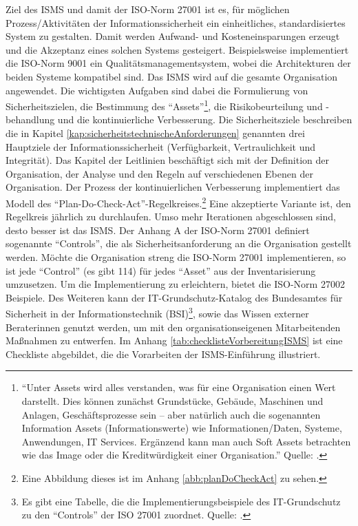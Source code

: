 Ziel des \ac{ISMS} und damit der ISO-Norm 27001 ist es, für möglichen Prozess/Aktivitäten der Informationssicherheit ein einheitliches, standardisiertes System zu gestalten. Damit werden Aufwand- und Kosteneinsparungen erzeugt und die Akzeptanz eines solchen Systems gesteigert. Beispielsweise implementiert die ISO-Norm 9001 ein Qualitätsmanagementsystem\autocite{dindeutsches_institut_fur_normung_qualitatsmanagementsysteme_2020}, wobei die Architekturen der beiden Systeme kompatibel sind. Das \ac{ISMS} wird auf die gesamte Organisation angewendet. Die wichtigsten Aufgaben sind dabei die Formulierung von Sicherheitszielen, die Bestimmung des \enquote{Assets}\footnote{\enquote{Unter Assets wird alles verstanden, was für eine Organisation einen Wert darstellt. Dies können zunächst Grundstücke, Gebäude, Maschinen und Anlagen, Geschäftsprozesse sein – aber natürlich auch die sogenannten Information Assets (Informationswerte) wie Informationen/Daten, Systeme, Anwendungen, IT Services. Ergänzend kann man auch Soft Assets betrachten wie das Image oder die Kreditwürdigkeit einer Organisation.} Quelle: \cite[][S.\,8]{kersten_it-sicherheitsmanagement_2020}.}, die Risikobeurteilung und -behandlung und die kontinuierliche Verbesserung. Die Sicherheitsziele beschreiben die in Kapitel \vref{kap:sicherheitstechnischeAnforderungen} genannten drei Hauptziele der Informationssicherheit (Verfügbarkeit, Vertraulichkeit und Integrität). Das Kapitel der Leitlinien beschäftigt sich mit der Definition der Organisation, der Analyse und den Regeln auf verschiedenen Ebenen der Organisation. Der Prozess der kontinuierlichen Verbesserung implementiert das Modell des \enquote{Plan-Do-Check-Act}-Regelkreises.\footnote{Eine Abbildung dieses ist im Anhang \vref{abb:planDoCheckAct} zu sehen.} Eine akzeptierte Variante ist, den Regelkreis jährlich zu durchlaufen. Umso mehr Iterationen abgeschlossen sind, desto besser ist das \ac{ISMS}.\autocite[vgl.][S.\,16]{dindeutsches_institut_fur_normung_informationstechnik_2020} Der Anhang A der ISO-Norm 27001 definiert sogenannte \enquote{Controls}, die als Sicherheitsanforderung an die Organisation gestellt werden. Möchte die Organisation streng die ISO-Norm 27001 implementieren, so ist jede \enquote{Control} (es gibt 114) für jedes \enquote{Asset} aus der Inventarisierung umzusetzen. Um die Implementierung zu erleichtern, bietet die ISO-Norm 27002\autocite[vgl.][]{deutsches_institut_fur_normung_ev_informationstechnik_2017} Beispiele. Des Weiteren kann der IT-Grundschutz-Katalog des Bundesamtes für Sicherheit in der Informationstechnik (\acs{BSI})\footnote{Es gibt eine Tabelle, die die Implementierungsbeispiele des IT-Grundschutz zu den  \enquote{Controls} der ISO 27001 zuordnet. Quelle: \cite[][]{bundesamt_fur_sicherheit_in_der_informationstechnik_bsi_zuordnungstabelle_2018}.}, sowie das Wissen externer Beraterinnen genutzt werden, um mit den organisationseigenen Mitarbeitenden Maßnahmen zu entwerfen. Im Anhang \vref{tab:checklisteVorbereitungISMS} ist eine Checkliste abgebildet, die die Vorarbeiten der \ac{ISMS}-Einführung illustriert.
 
